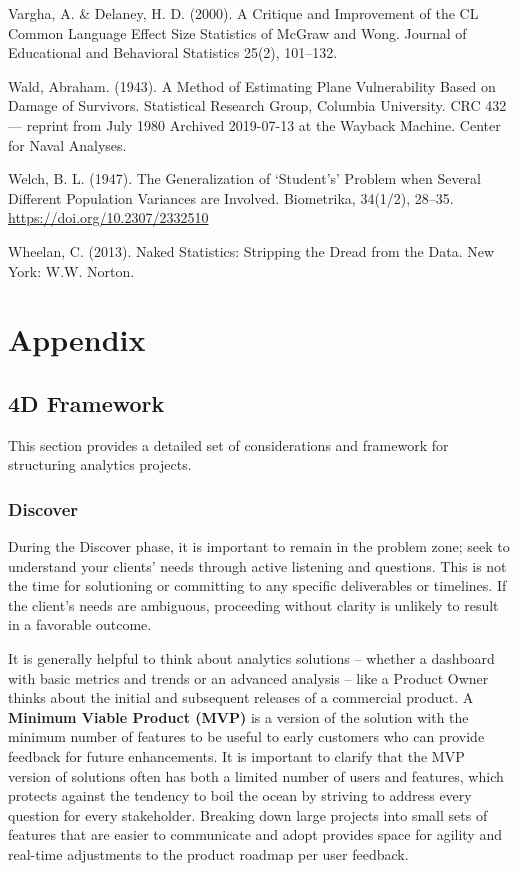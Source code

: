 \documentclass[
]{book}
\begin{document}
Vargha, A. \& Delaney, H. D. (2000). A Critique and Improvement of the CL Common Language Effect Size Statistics of McGraw and Wong. Journal of Educational and Behavioral Statistics 25(2), 101--132.

Wald, Abraham. (1943). A Method of Estimating Plane Vulnerability Based on Damage of Survivors. Statistical Research Group, Columbia University. CRC 432 --- reprint from July 1980 Archived 2019-07-13 at the Wayback Machine. Center for Naval Analyses.

Welch, B. L. (1947). The Generalization of `Student's' Problem when Several Different Population Variances are Involved. Biometrika, 34(1/2), 28--35. \url{https://doi.org/10.2307/2332510}

Wheelan, C. (2013). Naked Statistics: Stripping the Dread from the Data. New York: W.W. Norton.

\hypertarget{appendix}{%
\chapter{Appendix}\label{appendix}}

\hypertarget{d-framework-1}{%
\section{4D Framework}\label{d-framework-1}}

This section provides a detailed set of considerations and framework for structuring analytics projects.

\hypertarget{discover}{%
\subsection{Discover}\label{discover}}

During the Discover phase, it is important to remain in the problem zone; seek to understand your clients' needs through active listening and questions. This is not the time for solutioning or committing to any specific deliverables or timelines. If the client's needs are ambiguous, proceeding without clarity is unlikely to result in a favorable outcome.

It is generally helpful to think about analytics solutions -- whether a dashboard with basic metrics and trends or an advanced analysis -- like a Product Owner thinks about the initial and subsequent releases of a commercial product. A \textbf{Minimum Viable Product (MVP)} is a version of the solution with the minimum number of features to be useful to early customers who can provide feedback for future enhancements. It is important to clarify that the MVP version of solutions often has both a limited number of users and features, which protects against the tendency to boil the ocean by striving to address every question for every stakeholder. Breaking down large projects into small sets of features that are easier to communicate and adopt provides space for agility and real-time adjustments to the product roadmap per user feedback.
\end{document}
